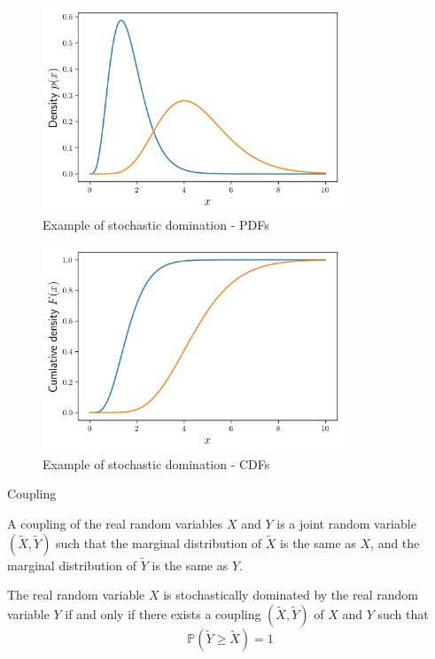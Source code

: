 \begin{figure}[h]
	\centering
	\includegraphics[width=0.8\textwidth]{./figures/stochastic_domination_pdf.png}
	\caption{Example of stochastic domination - PDFs}
\end{figure}
\begin{figure}[h]
	\centering
	\includegraphics[width=0.8\textwidth]{./figures/stochastic_domination_cdf.png}
	\caption{Example of stochastic domination - CDFs}
\end{figure}

\begin{definition} %
	Coupling

	\noindent
	A  coupling of the real random variables $X$ and $Y$ is a joint random variable $(\tilde{X}, \tilde{Y})$ such that the marginal distribution of $\tilde{X}$ is the same as $X$, and the marginal distribution of $\tilde{Y}$ is the same as $Y$.
\end{definition}


\begin{theorem}\label{theorem:couplingDomination}
	The real random variable $X$ is stochastically dominated by the real random variable $Y$ if and only if there exists a coupling $(\tilde{X}, \tilde{Y})$ of $X$ and $Y$ such that
	$$
		\mathbb{P}(\tilde{Y} \geq \tilde{X}) = 1
	$$
\end{theorem}

